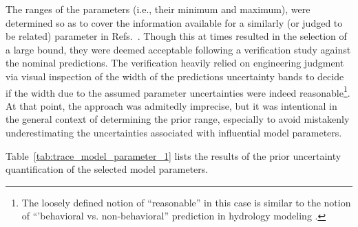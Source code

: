 The ranges of the parameters (i.e., their minimum and maximum), were determined so as to cover the information available for a similarly (or judged to be related) parameter in Refs.~\cite{Wickett1991,Glaeser2008a}.
Though this at times resulted in the selection of a large bound, they were deemed acceptable following a verification study against the nominal predictions.
The verification heavily relied on engineering judgment via visual inspection of the width of the predictions uncertainty bands to decide if the width due to the assumed parameter uncertainties were indeed reasonable\footnote{The loosely defined notion of ``reasonable'' in this case is similar to the notion of ``'behavioral vs. non-behavioral'' prediction in hydrology modeling \cite{Beven2009}.}.
At that point, the approach was admitedly imprecise, but it was intentional in the general context of determining the prior range, especially to avoid mistakenly underestimating the uncertainties associated with influential model parameters. 

%
Table~\ref{tab:trace_model_parameter_1} lists the results of the prior uncertainty quantification of the selected model parameters.
